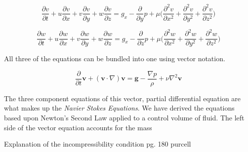 \documentclass[twocolumn,12pth]{article}
\begin{document}
\begin{equation*}
\frac{\partial{v}}{\partial{t}} + u\frac{\partial{v}}{\partial{x}} + v\frac{\partial{v}}{\partial{y}} + w\frac{\partial{v}}{\partial{z}} = g_x -\frac{\partial}{\partial{y}}p + \mu \bigg( \frac{\partial^2v}{\partial{x}^2} + \frac{\partial^2v}{\partial{y}^2} + \frac{\partial^2v}{\partial{z}^2} \bigg)
\end{equation*}

\begin{equation*}
\frac{\partial{w}}{\partial{t}} + u\frac{\partial{w}}{\partial{x}} + v\frac{\partial{w}}{\partial{y}} + w\frac{\partial{w}}{\partial{z}} = g_x -\frac{\partial}{\partial{z}}p + \mu \bigg( \frac{\partial^2w}{\partial{x}^2} + \frac{\partial^2w}{\partial{y}^2} + \frac{\partial^2w}{\partial{z}^2} \bigg)
\end{equation*}

All three of the equations can be bundled into one using vector notation.

\begin{equation}
\frac{\partial}{\partial{t}} \mathbf{v} + (\mathbf{v} \cdot \nabla)\mathbf{v} = \mathbf{g} - \frac{\nabla{p}}{\rho} + \nu\nabla^2{\mathbf{v}}
\end{equation}

The three component equations of this vector, partial differential equation are what makes up the \textit{Navier Stokes Equations}.
We have derived the equations based upon Newton's Second Law applied to a control volume of fluid.
The left side of the vector equation accounts for the mass 

Explanation of the incompressibility condition pg. 180 purcell


\nocite{*}

\end{document}
